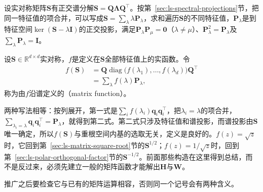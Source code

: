 设实对称矩阵$\bm S$有正交谱分解$\bm S=\bm Q\bm\Lambda\bm Q^\top$。按第~\ref{sec:ls-spectral-projections}节，把同一特征值的项合并，可以写成$\bm S=\sum_\lambda\lambda\bm P_\lambda$，求和遍历$\bm S$的不同特征值，$\bm P_\lambda$是到特征空间$\ker(\bm S-\lambda\bm I)$的正交投影，满足$\bm P_\lambda\bm P_\mu=\bm0$（$\lambda\neq\mu$）、$\bm P_\lambda^2=\bm P_\lambda$及$\sum_\lambda\bm P_\lambda=\bm I$。

\begin{definition}[对称矩阵的谱函数]
\label{def:ls-symmetric-matrix-function}
设$\bm S\in\mathbb R^{d\times d}$实对称，$f$是定义在$\bm S$全部特征值上的实函数。令
\begin{equation}
\begin{aligned}
 f(\bm S)
 &=\bm Q\operatorname{diag}\bigl(f(\lambda_1),\ldots,f(\lambda_d)\bigr)\bm Q^\top\\
 &=\sum_\lambda f(\lambda)\bm P_\lambda ,
\end{aligned}
\label{eq:ls-symmetric-spectral-function}
\end{equation}
称为由$f$沿谱定义的（matrix function）。
\end{definition}

两种写法相等：按列展开，第一式是$\sum_if(\lambda_i)\bm q_i\bm q_i^\top$，把$\lambda_i=\lambda$的项合并，$\sum_{\lambda_i=\lambda}\bm q_i\bm q_i^\top=\bm P_\lambda$，就得到第二式。第二式只涉及特征值和谱投影，而谱投影由$\bm S$唯一确定，所以$f(\bm S)$与重根空间内基的选取无关，定义是良好的。$f(z)=\sqrt z$时，它回到第~\ref{sec:ls-matrix-square-root}节的$\bm S^{1/2}$；$f(z)=1/\sqrt z$时，回到第~\ref{sec:ls-polar-orthogonal-factor}节的$\bm S^{-1/2}$。前面那些构造在这里得到总结，而不是反过来，必须先建立一般的矩阵函数才能解出$\bm H$与$\bm W$。

推广之后要检查它与已有的矩阵运算相容，否则同一个记号会有两种含义。

